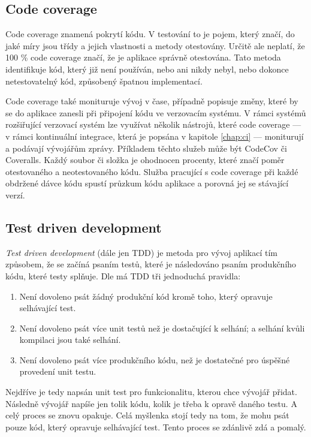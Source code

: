 \subsection{Code coverage}

Code coverage znamená pokrytí kódu.
V testování to je pojem,
který značí,
do jaké míry jsou třídy a jejich vlastnosti a metody otestovány.
Určitě ale neplatí,
že 100 \% code coverage značí,
že je aplikace správně otestována.
Tato metoda identifikuje kód,
který již není používán,
nebo ani nikdy nebyl,
nebo dokonce netestovatelný kód,
způsobený špatnou implementací.
\cite{code_coverage}

Code coverage také monituruje vývoj v čase,
případně popisuje změny,
které by se do aplikace zanesli při připojení kódu ve verzovacím systému.
V rámci systémů rozšiřující verzovací systém lze využívat několik nástrojů,
které code coverage
--- v rámci kontinuální integrace, která je popsána v kapitole \ref{chap:ci} ---
moniturují a podávají vývojářům zprávy.
Příkladem těchto služeb může být CodeCov či Coveralls.
Každý soubor či složka je ohodnocen procenty,
které značí poměr otestovaného a neotestovaného kódu.
Služba pracující s code coverage při každé obdržené dávce kódu spustí
průzkum kódu aplikace a porovná jej se stávající verzí.
\cite{code_coverage}

\subsection{Test driven development}

\emph{Test driven development} (dále jen TDD) je metoda pro vývoj aplikací tím
způsobem,
že se začíná psaním testů,
které je následováno psaním produkčního kódu,
které testy splňuje.
Dle \cite{tdd} má TDD tři jednoduchá pravidla:

\begin{enumerate}
    \item Není dovoleno psát žádný produkční kód kromě toho,
    který opravuje selhávající test.
    \item Není dovoleno psát více unit testů než je dostačující k selhání;
    a selhání kvůli kompilaci jsou také selhání.
    \item Není dovoleno psát více produkčního kódu,
    než je dostatečné pro úspěšné provedení unit testu.
\end{enumerate}

Nejdříve je tedy napsán unit test pro funkcionalitu,
kterou chce vývojář přidat.
Následně vývojář napíše jen tolik kódu,
kolik je třeba k opravě daného testu.
A celý proces se znovu opakuje.
Celá myšlenka \cite{tdd} stojí tedy na tom,
že mohu psát pouze kód,
který opravuje selhávající test.
Tento proces se zdánlivě zdá  a pomalý.
 \cite{tdd}
 
